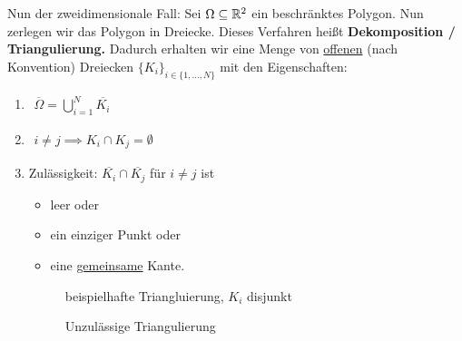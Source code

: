 Nun der zweidimensionale Fall: Sei $\Omega\subseteq\mathbb{R}^2$ ein beschränktes Polygon. Nun zerlegen wir das Polygon in Dreiecke. Dieses Verfahren heißt \textbf{Dekomposition / Triangulierung.} Dadurch erhalten wir eine Menge von \underline{offenen} (nach Konvention) Dreiecken $\lbrace K_i\rbrace_{i\in\lbrace1,\ldots,N\rbrace}$ mit den Eigenschaften:

\begin{enumerate}[label=(\roman*)]
	\item $\begin{aligned}
		\overline{\Omega}=\bigcup\limits_{i=1}^N \overline{K_i}
		\end{aligned}$
	\item $\begin{aligned}
		i\neq j\implies K_i\cap K_j=\emptyset
	\end{aligned}$
	\item Zulässigkeit: $\overline{K_i}\cap\overline{K_j}$ für $i\neq j$ ist
	\begin{itemize}
		\item leer oder
		\item ein einziger Punkt oder
		\item eine \ul{gemeinsame} Kante.
	\end{itemize}

	\begin{figure}[!ht]
		\begin{center}
			
			\caption{beispielhafte Triangluierung, $K_i$ disjunkt}
			\label{AbbTriangulierung}
		\end{center}
	\end{figure}

	\begin{figure}[!ht]
		\begin{center}
			
			\caption{Unzulässige Triangulierung}
			\label{AbbUnzulaessigeTriangulierung}
		\end{center}
	\end{figure}
\end{enumerate}

